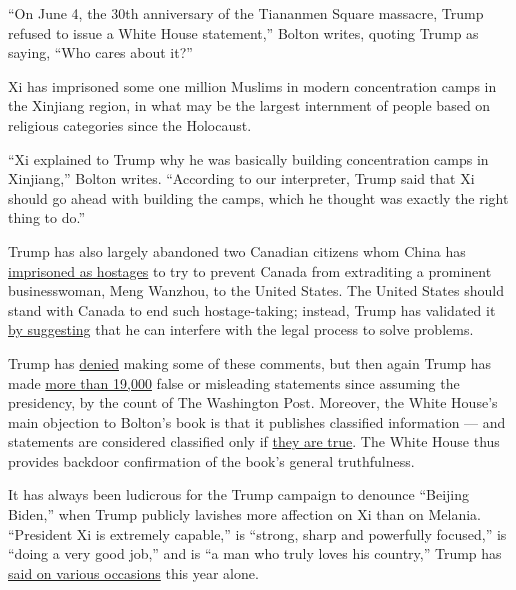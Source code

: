 ``On June 4, the 30th anniversary of the Tiananmen Square massacre,
Trump refused to issue a White House statement,'' Bolton writes, quoting
Trump as saying, ``Who cares about it?''

Xi has imprisoned some one million Muslims in modern concentration camps
in the Xinjiang region, in what may be the largest internment of people
based on religious categories since the Holocaust.

``Xi explained to Trump why he was basically building concentration
camps in Xinjiang,'' Bolton writes. ``According to our interpreter,
Trump said that Xi should go ahead with building the camps, which he
thought was exactly the right thing to do.''

Trump has also largely abandoned two Canadian citizens whom China has
\href{https://www.nytimes.com/2020/06/19/world/asia/china-canada-kovrig-spavor.html}{imprisoned
as hostages} to try to prevent Canada from extraditing a prominent
businesswoman, Meng Wanzhou, to the United States. The United States
should stand with Canada to end such hostage-taking; instead, Trump has
validated it \href{https://www.bbc.com/news/world-us-canada-46533971}{by
suggesting} that he can interfere with the legal process to solve
problems.

Trump has
\href{https://www.wsj.com/articles/transcript-of-president-trumps-interview-with-the-wall-street-journal-11592501000}{denied}
making some of these comments, but then again Trump has made
\href{https://www.washingtonpost.com/graphics/politics/trump-claims-database/?itid=lk_inline_manual_3\&itid=lk_inline_manual_3}{more
than 19,000} false or misleading statements since assuming the
presidency, by the count of The Washington Post. Moreover, the White
House's main objection to Bolton's book is that it publishes classified
information --- and statements are considered classified only if
\href{https://www.businessinsider.com/trumps-claim-bolton-is-lying-contradicts-claim-book-is-classified-2020-6}{they
are true}. The White House thus provides backdoor confirmation of the
book's general truthfulness.

It has always been ludicrous for the Trump campaign to denounce
``Beijing Biden,'' when Trump publicly lavishes more affection on Xi
than on Melania. ``President Xi is extremely capable,'' is ``strong,
sharp and powerfully focused,'' is ``doing a very good job,'' and is ``a
man who truly loves his country,'' Trump has
\href{https://www.politico.com/news/2020/04/15/trump-china-coronavirus-188736}{said
on various occasions} this year alone.


